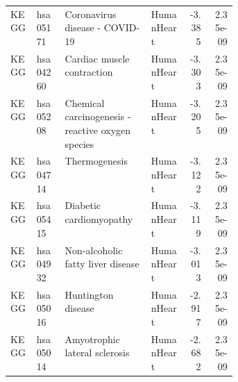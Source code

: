 \begin{table}[htbp]
\begin{tabular}{llp{0.38\linewidth}lrr}
 \\
KEGG & hsa05171 & Coronavirus disease - COVID-19 & HumanHeart & -3.385 & 2.35e-09
 \\
KEGG & hsa04260 & Cardiac muscle contraction & HumanHeart & -3.303 & 2.35e-09
 \\
KEGG & hsa05208 & Chemical carcinogenesis - reactive oxygen species & HumanHeart & -3.205 & 2.35e-09
 \\
KEGG & hsa04714 & Thermogenesis & HumanHeart & -3.122 & 2.35e-09
 \\
KEGG & hsa05415 & Diabetic cardiomyopathy & HumanHeart & -3.119 & 2.35e-09
 \\
KEGG & hsa04932 & Non-alcoholic fatty liver disease & HumanHeart & -3.013 & 2.35e-09
 \\
KEGG & hsa05016 & Huntington disease & HumanHeart & -2.917 & 2.35e-09
 \\
KEGG & hsa05014 & Amyotrophic lateral sclerosis & HumanHeart & -2.682 & 2.35e-09
 \\
\bottomrule
\end{tabular}
\end{table}
